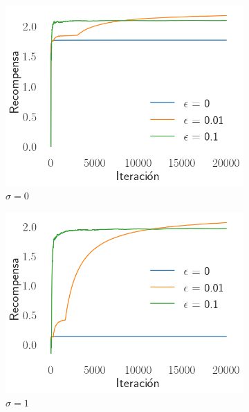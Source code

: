 \documentclass[12pt]{article}
\begin{document}
    \begin{figure}[H]
        \centering
        \begin{subfigure}[H]{0.3\textwidth}
            \includegraphics[width=\textwidth]{../img/20000/reward_iteration_sigma_0}
            \caption{$\sigma=0$}
            \label{fig:average_reward_0}
        \end{subfigure}
        \begin{subfigure}[H]{0.3\textwidth}
            \includegraphics[width=\textwidth]{../img/20000/reward_iteration_sigma_1}
            \caption{$\sigma=1$}
            \label{fig:average_reward_1}
        \end{subfigure}
        \begin{subfigure}[H]{0.3\textwidth}

\end{subfigure}
\end{figure}
\end{document}
